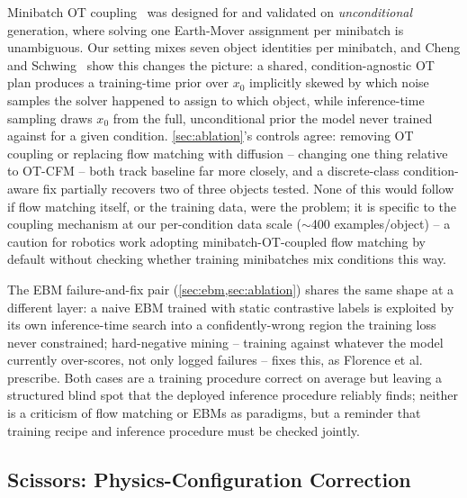 \documentclass[journal]{IEEEtran}
\begin{document}
Minibatch OT coupling~\cite{tong2023otcfm} was designed for and validated on
\emph{unconditional} generation, where solving one Earth-Mover assignment
per minibatch is unambiguous. Our setting mixes seven object identities per
minibatch, and Cheng and Schwing~\cite{cheng2025curse} show this changes
the picture: a shared, condition-agnostic OT plan produces a training-time
prior over $x_0$ implicitly skewed by which noise samples the solver
happened to assign to which object, while inference-time sampling draws
$x_0$ from the full, unconditional prior the model never trained against
for a given condition. \cref{sec:ablation}'s controls agree: removing OT
coupling or replacing flow matching with diffusion -- changing one thing
relative to OT-CFM -- both track baseline far more closely, and a
discrete-class condition-aware fix partially recovers two of three objects
tested. None of this would follow if flow matching itself, or the training
data, were the problem; it is specific to the coupling mechanism at our
per-condition data scale ($\sim$400 examples/object) -- a caution for
robotics work adopting minibatch-OT-coupled flow matching by default
without checking whether training minibatches mix conditions this way.

The EBM failure-and-fix pair (\cref{sec:ebm,sec:ablation}) shares the same
shape at a different layer: a naive EBM trained with static contrastive
labels is exploited by its own inference-time search into a
confidently-wrong region the training loss never constrained; hard-negative
mining -- training against whatever the model currently over-scores, not
only logged failures -- fixes this, as Florence et al.~\cite{florence2021implicit}
prescribe. Both cases are a training procedure correct on average but
leaving a structured blind spot that the deployed inference procedure
reliably finds; neither is a criticism of flow matching or EBMs as
paradigms, but a reminder that training recipe and inference procedure must
be checked jointly.

\subsection{Scissors: Physics-Configuration Correction}
\label{ssec:scissors}
\end{document}
